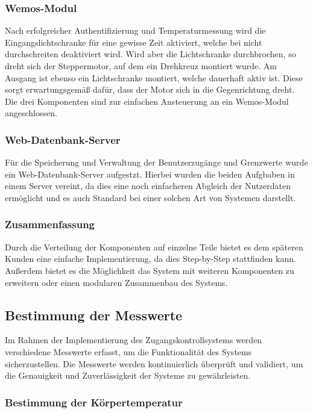 \subsubsection{Wemos-Modul}

Nach erfolgreicher Authentifizierung und Temperaturmessung wird die Eingangslichtschranke für eine gewisse Zeit aktiviert, welche bei nicht durchschreiten deaktiviert wird. Wird aber die Lichtschranke durchbrochen, so dreht sich der Steppermotor, auf dem ein Drehkreuz montiert wurde. Am Ausgang ist ebenso ein Lichtschranke montiert, welche dauerhaft aktiv ist. Diese sorgt erwartungsgemäß dafür, dass der Motor sich in die Gegenrichtung dreht. Die drei Komponenten sind zur einfachen Ansteuerung an ein Wemos-Modul angeschlossen.

\subsubsection{Web-Datenbank-Server}

Für die Speicherung und Verwaltung der Benutzerzugänge und Grenzwerte wurde ein Web-Datenbank-Server aufgestzt. Hierbei wurden die beiden Aufgbaben in einem Server vereint, da dies eine noch einfacheren Abgleich der Nutzerdaten ermöglicht und es auch Standard bei einer solchen Art von Systemen darstellt.

\subsubsection{Zusammenfassung}

Durch die Verteilung der Komponenten auf einzelne Teile bietet es dem späteren Kunden eine einfache Implementierung, da dies Step-by-Step stattfinden kann. Außerdem bietet es die Möglichkeit das System mit weiteren Komponenten zu erweitern oder einen modularen Zusammenbau des Systems.


\subsection{Bestimmung der Messwerte}

Im Rahmen der Implementierung des Zugangskontrollsystems werden verschiedene Messwerte erfasst, um die Funktionalität des Systems sicherzustellen. Die Messwerte werden kontinuierlich überprüft und validiert, um die Genauigkeit und Zuverlässigkeit der Systeme zu gewährleisten.

\subsubsection{Bestimmung der Körpertemperatur}

